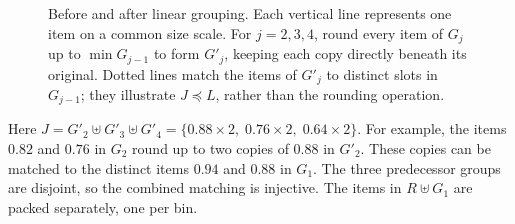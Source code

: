 \begin{figure}[H]
    \caption{Before and after linear grouping. Each vertical line
    represents one item on a common size scale. For $j=2,3,4$,
    round every item of $G_j$ up to $\min G_{j-1}$ to form $G'_j$,
    keeping each copy directly beneath its original. Dotted lines
    match the items of $G'_j$ to distinct slots in $G_{j-1}$;
    they illustrate $J\preceq L$, rather than the rounding operation.}
    \label{fig:linear-grouping}
\end{figure}

Here $J=G'_2\uplus G'_3\uplus G'_4
=\{0.88\times2,\;0.76\times2,\;0.64\times2\}$.
For example, the items $0.82$ and $0.76$ in $G_2$ round up to
two copies of $0.88$ in $G'_2$. These copies can be matched to
the distinct items $0.94$ and $0.88$ in $G_1$.
The three predecessor groups are disjoint, so the combined
matching is injective. The items in $R\uplus G_1$ are packed
separately, one per bin.
